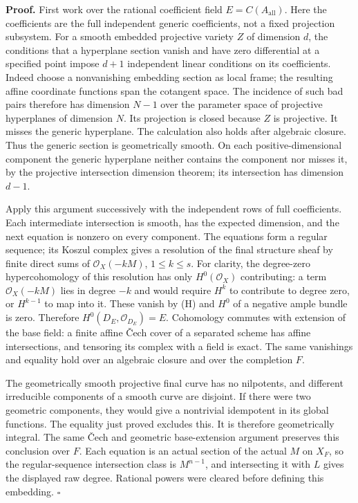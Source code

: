 \documentclass[
  11pt,
]{article}
\begin{document}
\textbf{Proof.} First work over the rational coefficient field
\(E=C(A_{\mathrm{all}})\). Here the coefficients are the full
independent generic coefficients, not a fixed projection subsystem. For
a smooth embedded projective variety \(Z\) of dimension \(d\), the
conditions that a hyperplane section vanish and have zero differential
at a specified point impose \(d+1\) independent linear conditions on its
coefficients. Indeed choose a nonvanishing embedding section as local
frame; the resulting affine coordinate functions span the cotangent
space. The incidence of such bad pairs therefore has dimension \(N-1\)
over the parameter space of projective hyperplanes of dimension \(N\).
Its projection is closed because \(Z\) is projective. It misses the
generic hyperplane. The calculation also holds after algebraic closure.
Thus the generic section is geometrically smooth. On each
positive-dimensional component the generic hyperplane neither contains
the component nor misses it, by the projective intersection dimension
theorem; its intersection has dimension \(d-1\).

Apply this argument successively with the independent rows of full
coefficients. Each intermediate intersection is smooth, has the expected
dimension, and the next equation is nonzero on every component. The
equations form a regular sequence; its Koszul complex gives a resolution
of the final structure sheaf by finite direct sums of
\(\mathcal O_X(-kM)\), \(1\leq k\leq s\). For clarity, the degree-zero
hypercohomology of this resolution has only \(H^0(\mathcal O_X)\)
contributing: a term \(\mathcal O_X(-kM)\) lies in degree \(-k\) and
would require \(H^k\) to contribute to degree zero, or \(H^{k-1}\) to
map into it. These vanish by (H) and \(H^0\) of a negative ample bundle
is zero. Therefore \(H^0(D_E,\mathcal O_{D_E})=E\). Cohomology commutes
with extension of the base field: a finite affine Čech cover of a
separated scheme has affine intersections, and tensoring its complex
with a field is exact. The same vanishings and equality hold over an
algebraic closure and over the completion \(F\).

The geometrically smooth projective final curve has no nilpotents, and
different irreducible components of a smooth curve are disjoint. If
there were two geometric components, they would give a nontrivial
idempotent in its global functions. The equality just proved excludes
this. It is therefore geometrically integral. The same Čech and
geometric base-extension argument preserves this conclusion over \(F\).
Each equation is an actual section of the actual \(M\) on \(X_F\), so
the regular-sequence intersection class is \(M^{n-1}\), and intersecting
it with \(L\) gives the displayed raw degree. Rational powers were
cleared before defining this embedding. \(\square\)
\end{document}
